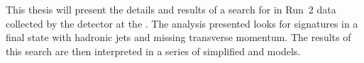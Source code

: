 This thesis will present the details and results of a search
for \SUSY in Run~2 data collected by the \CMS detector at the \LHC.
The analysis presented looks for \SUSY signatures in a final state
with hadronic jets and missing transverse momentum. The results of
this search are then interpreted in a series of simplified \SUSY and \DM
models.

%
%

%

